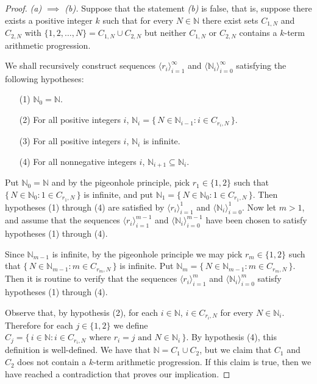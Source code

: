 \documentclass[12pt,showtrims]{memoir}
\theoremstyle{plain}
\theoremstyle{definition}
\newcommand{\la}{\langle}
\newcommand{\ra}{\rangle}
\newcommand{\bbN}{\mathbb{N}}
\begin{document}
\begin{proof}
  \textsl{(a) $\implies$ (b).}
  Suppose that the statement \textsl{(b)} is false, that is, suppose there exists a positive integer $k$ such that for every $N \in \bbN$ there exist sets $C_{1,N}$ and $C_{2,N}$ with $\{1, 2, \ldots, N\} = C_{1, N} \cup C_{2, N}$ but neither $C_{1,N}$ or $C_{2,N}$ contains a $k$-term arithmetic progression. 

  We shall recursively construct sequences $\la r_i \ra_{i=1}^\infty$ and $\la \bbN_i \ra_{i=0}^\infty$ satisfying the following hypotheses:
  \begin{itemize}
    \item[(1)]
      $\bbN_0 = \bbN$.

    \item[(2)]
      For all positive integers $i$, $\bbN_i = \{\, N \in \bbN_{i-1} : i \in C_{r_i, N} \,\}$.

    \item[(3)]
      For all positive integers $i$, $\bbN_i$ is infinite.

    \item[(4)] 
      For all nonnegative integers $i$, $\bbN_{i+1} \subseteq \bbN_i$.
  \end{itemize}

  Put $\bbN_0 = \bbN$ and by the pigeonhole principle, pick $r_1 \in \{1, 2 \}$ such that $\{\, N \in \bbN_0 : 1 \in C_{r_1, N} \,\}$ is infinite, and put $\bbN_1 = \{\, N \in \bbN_0 : 1 \in C_{r_1, N} \,\}$.
  Then hypotheses (1) through (4) are satisfied by $\la r_i \ra_{i=1}^1$ and $\la \bbN_i \ra_{i=0}^1$.
  Now let $m > 1$, and assume that the sequences $\la r_i \ra_{i=1}^{m-1}$ and $\la \bbN_i \ra_{i=0}^{m-1}$ have been chosen to satisfy hypotheses (1) through (4).
  
  Since $\bbN_{m-1}$ is infinite, by the pigeonhole principle we may pick $r_m \in \{1, 2\}$ such that $\{\, N \in \bbN_{m-1} : m \in C_{r_m, N} \,\}$ is infinite. 
  Put $\bbN_m = \{\, N \in \bbN_{m-1} : m \in C_{r_m, N} \,\}$.
  Then it is routine to verify that the sequences $\la r_i \ra_{i=1}^m$ and $\la \bbN_i \ra_{i=0}^m$ satisfy hypotheses (1) through (4).

  Observe that, by hypothesis (2), for each $i \in \bbN$, $i \in C_{r_i, N}$ for every $N \in \bbN_i$.
  Therefore for each $j \in \{1, 2\}$ we define $C_j = \{\, i \in \bbN : \mbox{$i \in C_{r_i, N}$ where $r_i = j$ and $N \in \bbN_i$} \,\}$.
  By hypothesis (4), this definition is well-defined.
  We have that $\bbN = C_1 \cup C_2$, but we claim that $C_1$ and $C_2$ does not contain a $k$-term arithmetic progression. 
  If this claim is true, then we have reached a contradiction that proves our implication.


\end{proof}
\end{document}
